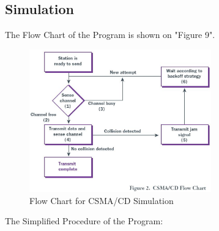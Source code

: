 \documentclass[11pt,a4paper]{report}
\begin{document}
\subsection*{Simulation}
The Flow Chart of the Program is shown on "Figure 9". \\
\begin{figure}
\centering
\includegraphics[width=0.7\textwidth]{4_1.eps}
\caption{Flow Chart for CSMA/CD Simulation}
\end{figure}

The Simplified Procedure of the Program: \\
\end{document}
